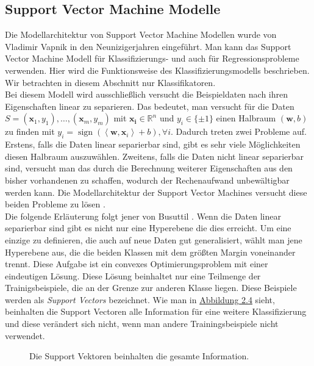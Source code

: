 \subsection{Support Vector Machine Modelle}

Die Modellarchitektur von Support Vector Machine Modellen wurde von Vladimir Vapnik \cite{SVMVapnik} in den Neunizigerjahren eingef\"uhrt. Man kann das 
Support Vector Machine Modell f\"ur Klassifizierungs- und auch f\"ur Regressionsprobleme verwenden. Hier wird die Funktionsweise des Klassifizierungsmodells
beschrieben. Wir betrachten in diesem Abschnitt nur Klassifikatoren. \\

Bei diesem Modell wird ausschlie{\ss}lich versucht die Beispieldaten nach ihren Eigenschaften linear zu separieren. Das bedeutet, man versucht f\"ur die 
Daten $S = (\mathbf{x}_1,y_1),\dots, (\mathbf{x}_m, y_m)$ mit $\mathbf{x_i} \in \mathbb{R}^n$ und $y_i \in \{\pm1\}$ einen Halbraum $(\mathbf{w},b)$ zu finden 
mit $y_i = \operatorname{sign}(\left\langle \mathbf{w},\mathbf{x}_i\right\rangle + b), \forall i$. Dadurch treten zwei Probleme auf. Erstens, falls die Daten linear separierbar sind, 
gibt es sehr viele M\"oglichkeiten diesen Halbraum auszuw\"ahlen. Zweitens, falls die Daten nicht linear separierbar sind, versucht man das durch die Berechnung 
weiterer Eigenschaften aus den bisher vorhandenen zu schaffen, wodurch der Rechenaufwand unbew\"altigbar werden kann. Die Modellarchitektur der Support Vector Machines versucht
diese beiden Probleme zu l\"osen \cite{shalev}. \\

Die folgende Erl\"auterung folgt jener von Busuttil \cite{SVM1}. Wenn die Daten linear separierbar sind gibt es nicht nur eine Hyperebene die dies erreicht.
Um eine einzige zu definieren, die auch auf neue Daten gut generalisiert, w\"ahlt man jene Hyperebene aus, die die beiden Klassen mit dem gr\"o{\ss}ten Margin 
voneinander trennt. Diese Aufgabe ist ein convexes Optimierungsproblem mit einer eindeutigen L\"osung. Diese L\"osung beinhaltet nur eine Teilmenge der Trainigsbeispiele, die 
an der Grenze zur anderen Klasse liegen. Diese Beispiele werden als \textit{Support Vectors} bezeichnet. Wie man in \hyperref[fig:svm2]{Abbildung 2.4} sieht, beinhalten die Support Vectoren
alle Information f\"ur eine weitere Klassifizierung und diese ver\"andert sich nicht, wenn man andere Trainingsbeispiele nicht verwendet. \\

\begin{figure}[ht]
  \label{fig:svm1}
  \begin{center}
    \begin{small}
    \end{small}
  \end{center}
  \caption[Darstellung der Support Vektoren]
    {Die Support Vektoren beinhalten die gesamte Information.}
\end{figure}



